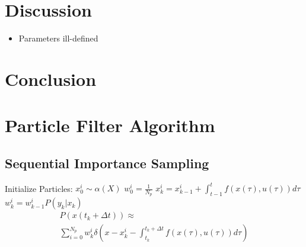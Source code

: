 \documentclass[journal]{./IEEEtran}
\begin{document}
\section{Discussion}
\label{sec:Discussion}

\begin{itemize}
\item Parameters ill-defined
\end{itemize}

\section{Conclusion}
\label{sec:Conclusion}


\appendices

\section{Particle Filter Algorithm}
\label{sec:algorithms}

\subsection{Sequential Importance Sampling}
\label{alg:BasicParticleFilter}
\begin{algorithm}
\begin{algorithmic}
\STATE Initialize Particles:
    \STATE $x^i_0  \sim \alpha(X)$
    \STATE $w^i_0 = \frac{1}{N_p}$
\ENDFOR
{}
        \STATE $x^i_k = x^i_{k-1} + \int_{t-1}^t f(x(\tau), u(\tau)) d\tau $
        \STATE $w^i_k = w^i_{k-1}P(y_k | x_k)$
    \ENDFOR
\ENDFOR
\begin{equation*}
\begin{array}{l}
P(x(t_k+\Delta t)) \approx \\
\sum_{i=0}^{N_p} w^i_k \delta\left(x - x^i_k - \int_{t_k}^{t_k+\Delta t} f(x(\tau), u(\tau)) d\tau \right) 
\end{array}
\end{equation*}
\end{algorithmic}
\end{algorithm}
\end{document}
